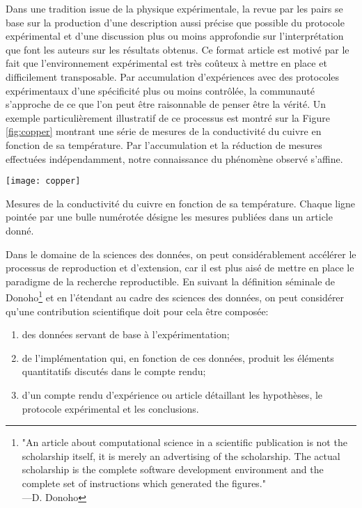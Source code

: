 Dans une tradition issue de la physique expérimentale, la revue par les pairs se base sur la production d'une description aussi précise que possible du protocole expérimental et d'une discussion plus ou moins approfondie sur l'interprétation que font les auteurs sur les résultats obtenus. Ce format \og article \fg est motivé par le fait que l'environnement expérimental est très coûteux à mettre en place et difficilement transposable. Par accumulation d'expériences avec des protocoles expérimentaux d'une spécificité plus ou moins contrôlée, la communauté s'approche de ce que l'on peut être raisonnable de penser être la vérité. Un exemple particulièrement illustratif de ce processus est montré sur la Figure \ref{fig:copper} montrant une série de mesures de la conductivité du cuivre en fonction de sa température. Par l'accumulation et la réduction de mesures effectuées indépendamment, notre connaissance du phénomène observé s'affine.

\begin{marginfigure}
  \texttt{[image: copper]}
  \caption{Mesures de la conductivité du cuivre en fonction de sa température. Chaque ligne pointée par une bulle numérotée désigne les mesures publiées dans un article donné.}
  \label{fig:copper}
\end{marginfigure}

Dans le domaine de la sciences des données, on peut considérablement accélérer le processus de reproduction et d'extension, car il est plus aisé de mettre en place le paradigme de la recherche reproductible. En suivant la définition séminale de Donoho\footnote{"An article about computational science in a scientific publication is not the scholarship itself, it is merely an advertising of the scholarship. The actual scholarship is the complete software development environment and the complete set of instructions which generated the figures." \\—D. Donoho} et en l'étendant au cadre des sciences des données, on peut considérer qu'une contribution scientifique doit pour cela être composée:
\begin{enumerate}
  \item des données servant de base à l'expérimentation;
  \item de l'implémentation qui, en fonction de ces données, produit les éléments quantitatifs discutés dans le compte rendu;
  \item d'un compte rendu d'expérience ou article détaillant les hypothèses, le protocole expérimental et les conclusions.
\end{enumerate}

